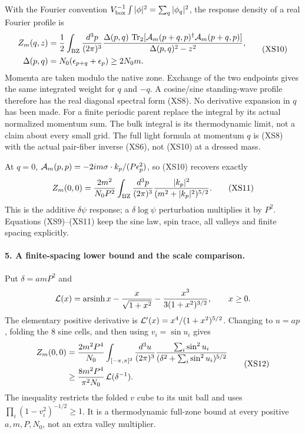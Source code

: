 \documentclass[11pt]{article}
\DeclareMathOperator{\Tr}{Tr}
\begin{document}
With the Fourier convention
$V_{\rm box}^{-1}\int|\phi|^2=\sum_q|\phi_q|^2$,
the response density of a real Fourier profile is
\begin{equation}
 \begin{aligned}
 Z_m(q,z)&=\frac12\int_{\rm BZ}\frac{d^3p}{(2\pi)^3}
 \frac{\Delta(p,q)\,
       \Tr_2[{\cal A}_m(p+q,p)^\dagger{\cal A}_m(p+q,p)]}
                 {\Delta(p,q)^2-z^2},\\
 \Delta(p,q)&=N_0(\epsilon_{p+q}+\epsilon_p)\geq2N_0m .
 \end{aligned}\tag{XS10}
\end{equation}
Momenta are taken modulo the native zone.  Exchange of the
two endpoints gives the same integrated weight for $q$ and
$-q$.  A cosine/sine standing-wave profile therefore has
the real diagonal spectral form (XS8).
No derivative expansion in $q$ has been made.
For a finite periodic parent replace the integral by its
actual normalized momentum sum.  The bulk integral is its
thermodynamic limit, not a claim about every small grid.
The full light formula at momentum $q$ is (XS8) with the
actual pair-fiber inverse (XS6), not (XS10) at a dressed mass.

At $q=0$,
${\cal A}_m(p,p)=-2im\sigma\cdot k_p/(P\epsilon_p^2)$,
so (XS10) recovers exactly
\begin{equation}
 Z_m(0,0)=\frac{2m^2}{N_0P^2}
 \int_{\rm BZ}\frac{d^3p}{(2\pi)^3}
              \frac{|k_p|^2}{(m^2+|k_p|^2)^{5/2}} .
 \tag{XS11}
\end{equation}
This is the additive $\delta\psi$ response; a
$\delta\log\psi$ perturbation multiplies it by $P^2$.
Equations (XS9)--(XS11) keep the sine law, spin trace,
all valleys and finite spacing explicitly.

\paragraph{5. A finite-spacing lower bound and the scale comparison.}
Put $\delta=amP^2$ and
\[
 {\cal L}(x)=\operatorname{arsinh}x
 -\frac{x}{\sqrt{1+x^2}}
 -\frac{x^3}{3(1+x^2)^{3/2}},\qquad x\geq0 .
\]
The elementary positive derivative is
${\cal L}'(x)=x^4/(1+x^2)^{5/2}$.
Changing to $u=ap$, folding the 8 sine cells, and then
using $v_i=\sin u_i$ gives
\begin{equation}
 \begin{aligned}
 Z_m(0,0)&=\frac{2m^2P^4}{N_0}
 \int_{[-\pi,\pi]^3}\frac{d^3u}{(2\pi)^3}
 \frac{\sum_i\sin^2u_i}
       {(\delta^2+\sum_i\sin^2u_i)^{5/2}}\\
 &\geq\frac{8m^2P^4}{\pi^2N_0}\,
                                  {\cal L}(\delta^{-1}) .
 \end{aligned}\tag{XS12}
\end{equation}
The inequality restricts the folded $v$ cube to its unit
ball and uses
$\prod_i(1-v_i^2)^{-1/2}\geq1$.
It is a thermodynamic full-zone bound at every positive
$a,m,P,N_0$, not an extra valley multiplier.
\end{document}
